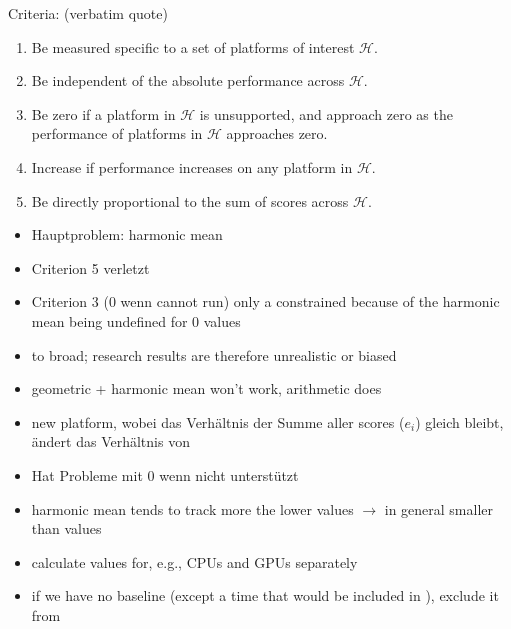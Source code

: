 Criteria: (verbatim quote)
\begin{enumerate}
    \item Be measured specific to a set of platforms of interest $\mathcal{H}$.
    \item Be independent of the absolute performance across $\mathcal{H}$.
    \item Be zero if a platform in $\mathcal{H}$ is unsupported, and approach zero as the performance of platforms in $\mathcal{H}$ approaches zero. 
    \item Increase if performance increases on any platform in $\mathcal{H}$.
    \item Be directly proportional to the sum of scores across $\mathcal{H}$.
\end{enumerate}

\newpage
\cite{marowka_toward_2021}

\begin{itemize}
    \item Hauptproblem: harmonic mean
    \item Criterion 5 verletzt
    \item Criterion 3 (0 wenn cannot run) only a constrained because of the harmonic mean being undefined for $0$ values
    \item \pp to broad; research results are therefore unrealistic or biased
    \item geometric + harmonic mean won't work, arithmetic does 
    \item new platform, wobei das Verhältnis der Summe aller scores ($e_i$) gleich bleibt, ändert das Verhältnis von \pp
    \item Hat Probleme mit $0$ wenn nicht unterstützt
    \item harmonic mean tends to track more the lower values $\rightarrow$ in general smaller \pp than \mpp values
    \item calculate values for, e.g., CPUs and GPUs separately
    \item if we have no baseline (except a time that would be included in \pp), exclude it from \mpp
\end{itemize}

